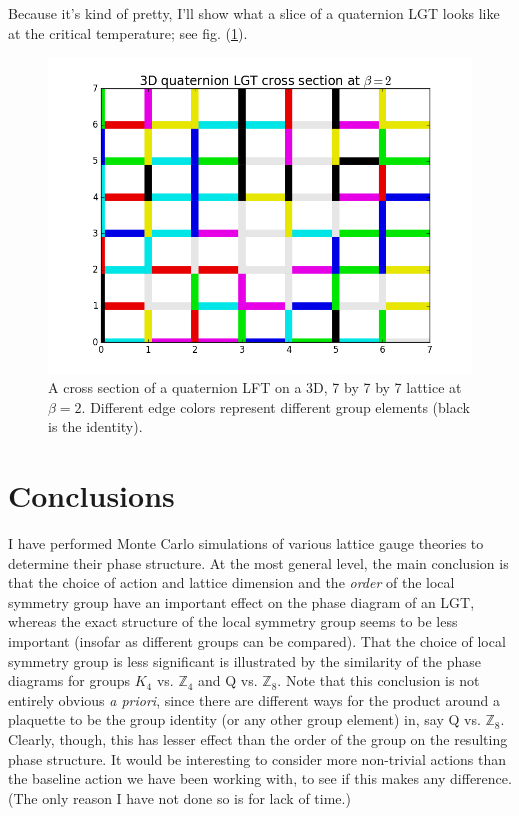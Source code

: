 \documentclass[9pt,twocolumn,twoside]{article}
\begin{document}
Because it's kind of pretty, I'll show what a slice of a quaternion LGT looks like at the critical temperature; see fig. (\ref{qcrosssection}).

\begin{figure}[h!]
	\begin{centering}
	\includegraphics[width=\columnwidth]{qcrosssection}
	\caption{A cross section of a quaternion LFT on a 3D, 7 by 7 by 7 lattice at $\beta=2$.  Different edge colors represent different group elements (black is the identity).}
	\label{qcrosssection}
	\end{centering}
\end{figure}


\section{Conclusions}
I have performed Monte Carlo simulations of various lattice gauge theories to determine their phase structure.  At the most general level, the main conclusion is that the choice of action and lattice dimension and the \textit{order} of the local symmetry group have an important effect on the phase diagram of an LGT, whereas the exact structure of the local symmetry group seems to be less important (insofar as different groups can be compared).  That the choice of local symmetry group is less significant is illustrated by the similarity of the phase diagrams for groups $K_4$ vs. $\mathbb{Z}_4$ and Q vs. $\mathbb{Z}_8$.  Note that this conclusion is not entirely obvious \textit{a priori}, since there are different ways for the product around a plaquette to be the group identity (or any other group element) in, say Q vs. $\mathbb{Z}_8$.  Clearly, though, this has lesser effect than the order of the group on the resulting phase structure.  It would be interesting to consider more non-trivial actions than the baseline action we have been working with, to see if this makes any difference.  (The only reason I have not done so is for lack of time.)
\end{document}
